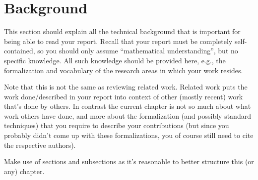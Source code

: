 \chapter{Background}\label{chap:background}

This section should explain all the technical background that is important for being able to read your report. Recall that your report must be completely self-contained, so you should only assume ``mathematical understanding'', but no specific knowledge. All such knowledge should be provided here, e.g., the formalization and vocabulary of the research areas in which your work resides.

Note that this is not the same as reviewing related work. Related work puts the work done/described in your report into context of other (mostly recent) work that's done by others. In contrast the current chapter is not so much about what work others have done, and more about the formalization (and possibly standard techniques) that you require to describe your contributions (but since you probably didn't come up with these formalizations, you of course still need to cite the respective authors).

Make use of sections and subsections as it's reasonable to better structure this (or any) chapter.
